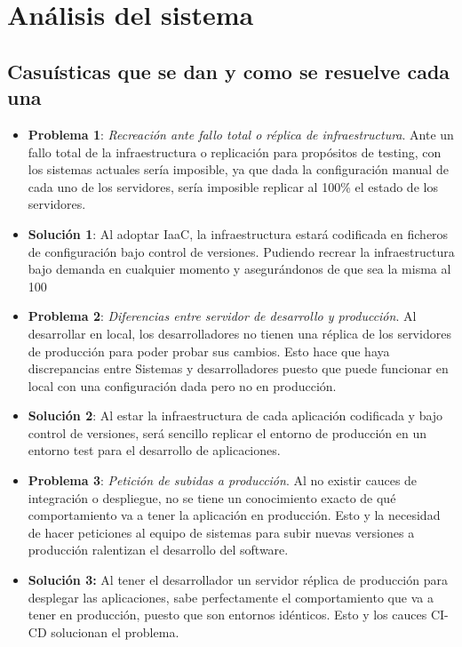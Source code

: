 \chapter {Análisis del sistema}

\section{Casuísticas que se dan y como se resuelve cada una}
		\begin{itemize}
			\item \textbf{Problema 1}: \textit{Recreación ante fallo total o réplica de infraestructura}. Ante un fallo total de la infraestructura o replicación para propósitos de testing, con los sistemas actuales sería imposible, ya que dada la configuración manual de cada uno de los servidores, sería imposible replicar al 100\% el estado de los servidores. 
			
			\item \textbf {Solución 1}: Al adoptar IaaC, la infraestructura estará codificada en ficheros de configuración bajo control de versiones. Pudiendo recrear la infraestructura bajo demanda en cualquier momento y asegurándonos de que sea la misma al 100%
			
			\item \textbf{Problema 2}: \textit{Diferencias entre servidor de desarrollo y producción}. Al desarrollar en local, los desarrolladores no tienen una réplica de los servidores de producción para poder probar sus cambios. Esto hace que haya discrepancias entre Sistemas y desarrolladores puesto que puede funcionar en local con una configuración dada pero no en producción. 
			
			\item \textbf {Solución 2}: Al estar la infraestructura de cada aplicación codificada y bajo control de versiones, será sencillo replicar el entorno de producción en un entorno test para el desarrollo de aplicaciones.
			
			\item \textbf{Problema 3}: \textit{Petición de subidas a producción}. Al no existir cauces de integración o despliegue, no se tiene un conocimiento exacto de qué comportamiento va a tener la aplicación en producción. Esto y la necesidad de hacer peticiones al equipo de sistemas para subir nuevas versiones a producción ralentizan el desarrollo del software.
			
			\item \textbf{Solución 3:} Al tener el desarrollador un servidor réplica de producción para desplegar las aplicaciones, sabe perfectamente el comportamiento que va a tener en producción, puesto que son entornos idénticos. Esto y los cauces CI-CD solucionan el problema.
			

\end{itemize}
